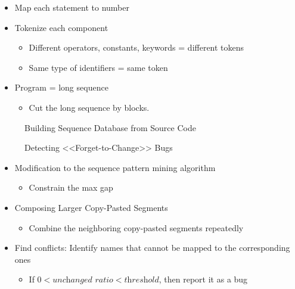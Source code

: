 \begin{itemize}
\item Map each statement to number
\item Tokenize each component 
    \begin{itemize}
    \item Different operators, constants, keywords = different tokens
    \item Same type of identifiers = same token
    \end{itemize}
\item Program = long sequence
    \begin{itemize}
    \item Cut the long sequence by blocks.
    \end{itemize}
\end{itemize}


\begin{figure}[h]
\centering
{}
\quad
{}

\caption{Building Sequence Database from Source Code}
\label{fig:cp34}
\end{figure}


\begin{figure}[h]
\centering
{}
\quad
{}

\caption{Detecting <<Forget-to-Change>> Bugs}
\label{fig:cp56}
\end{figure}

\begin{itemize}
\item Modification to the sequence pattern mining algorithm
    \begin{itemize}
    \item Constrain the max gap
    \end{itemize}
    
\item Composing Larger Copy-Pasted Segments
    \begin{itemize}
    \item Combine the neighboring copy-pasted segments repeatedly
    \end{itemize}
    
\item Find conflicts: Identify names that cannot be mapped to the corresponding ones
    \begin{itemize}
    \item If $0 < \textit{unchanged ratio} < \textit{threshold}$, then report it as a bug
    \end{itemize}
\end{itemize}


